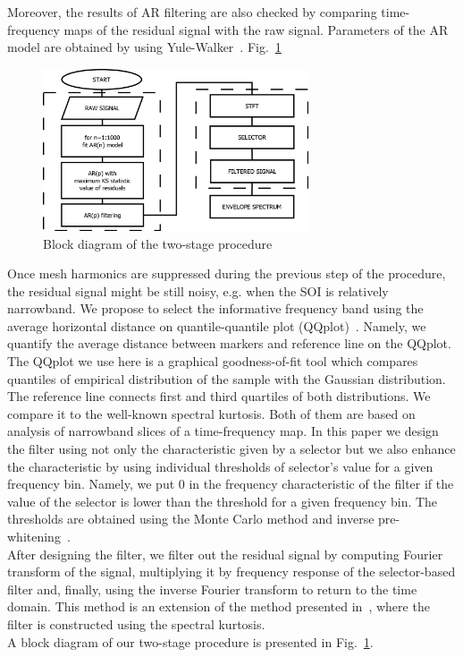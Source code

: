 Moreover, the results of AR filtering are also checked by comparing time-frequency maps of the residual signal with the raw signal. Parameters of the AR model are obtained by using Yule-Walker~\cite{Brockwell1991}.
Fig.~\ref{twostage_fig01}
\begin{figure}[ht]
\begin{center}
\includegraphics[width=0.7\textwidth]{methodology/twostage/twostage_diagram}
\caption{Block diagram of the two-stage procedure}\label{twostage_fig01}
\end{center}
\end{figure}
Once mesh harmonics are suppressed during the previous step of the procedure, the residual signal might be still noisy, e.g. when the SOI is relatively narrowband. We propose to select the informative frequency band using the average horizontal distance on quantile-quantile plot (QQplot)~\cite{Obuchowski2013441,Obuchowski2013,Obuchowski2014138}. Namely, we quantify the average distance between markers and reference line on the QQplot. The QQplot we use here is a graphical goodness-of-fit tool which compares quantiles of empirical distribution of the sample with the Gaussian distribution. The reference line connects first and third quartiles of both distributions. We compare it to the well-known spectral kurtosis. Both of them are based on analysis of narrowband slices of a time-frequency map. In this paper we design the filter using not only the characteristic given by a selector but we also enhance the characteristic by using individual thresholds of selector's value for a given frequency bin. Namely, we put 0 in the frequency characteristic of the filter if the value of the selector is lower than the threshold for a given frequency bin. The thresholds are obtained using the Monte Carlo method and inverse pre-whitening~\cite{Obuchowski2013}.\\
After designing the filter, we filter out the residual signal by computing Fourier transform of the signal, multiplying it by frequency response of the selector-based filter and, finally, using the inverse Fourier transform to return to the time domain. This method is an extension of the method presented in~\cite{Combet2009652}, where the filter is constructed using the spectral kurtosis.\\
A block diagram of our two-stage procedure is presented in Fig.~\ref{twostage_fig01}.
\FloatBarrier